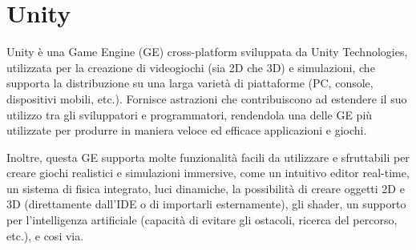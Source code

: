 \section{Unity} \label{unity}

Unity è una Game Engine (GE) cross-platform sviluppata da Unity Technologies, utilizzata per la creazione di videogiochi (sia 2D che 3D) e simulazioni, che supporta la distribuzione su una larga varietà di piattaforme (PC, console, dispositivi mobili, etc.). Fornisce astrazioni che contribuiscono ad estendere il suo utilizzo tra gli sviluppatori e programmatori, rendendola una delle GE più utilizzate per produrre in maniera veloce ed efficace applicazioni e giochi.\cite{unity}

\medskip

Inoltre, questa GE supporta molte funzionalità facili da utilizzare e sfruttabili per creare giochi realistici e simulazioni immersive, come un intuitivo editor real-time, un sistema di fisica integrato, luci dinamiche, la possibilità di creare oggetti 2D e 3D (direttamente dall'IDE o di importarli esternamente), gli shader, un supporto per l'intelligenza artificiale (capacità di evitare gli ostacoli, ricerca del percorso, etc.), e cosi via.

\medskip

